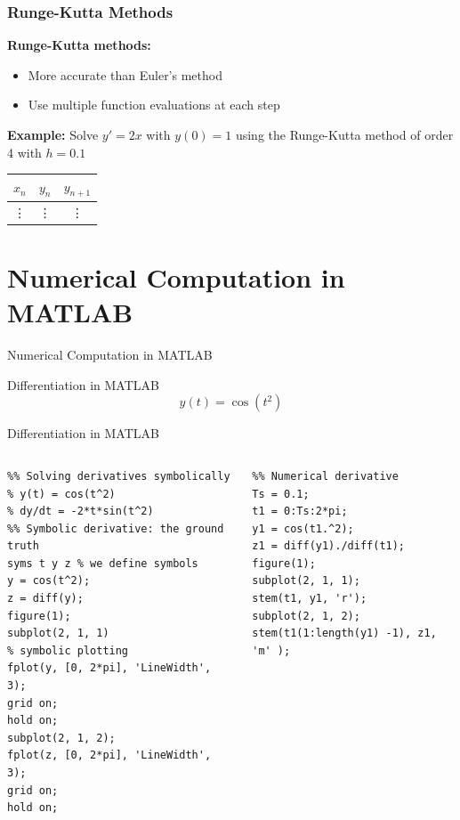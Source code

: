 \documentclass[aspectratio=169,xcolor=dvipsnames,svgnames,x11names,fleqn]{beamer}
\begin{document}
\begin{frame}
  \frametitle{Runge-Kutta Methods}
  \textbf{Runge-Kutta methods:}
  \begin{itemize}
    \item More accurate than Euler's method
    \item Use multiple function evaluations at each step
  \end{itemize}
  \textbf{Example:} Solve $y' = 2x$ with $y(0) = 1$ using the Runge-Kutta method of order 4 with $h = 0.1$
  \begin{table}
    \begin{tabular}{c|c|c}
      $x_n$ & $y_n$ & $y_{n+1}$ \\
      \hline
      \vdots & \vdots & \vdots
    \end{tabular}
  \end{table}
\end{frame}

\section{Numerical Computation in MATLAB}

\begin{frame}{}
    \begin{center}
    \Huge \bf \color{DarkBlue}
    \faFire
    
Numerical Computation in MATLAB

\end{center}
\end{frame}


\begin{frame}[containsverbatim]{Differentiation in MATLAB}
    $$
    y(t) = \cos(t^2)
    $$
\end{frame}
\begin{frame}[containsverbatim]{Differentiation in MATLAB}
    \footnotesize
\begin{columns}
    \begin{verbatim}
%% Solving derivatives symbolically
% y(t) = cos(t^2)
% dy/dt = -2*t*sin(t^2)
%% Symbolic derivative: the ground truth
syms t y z % we define symbols
y = cos(t^2);
z = diff(y);
figure(1);
subplot(2, 1, 1)
% symbolic plotting
fplot(y, [0, 2*pi], 'LineWidth', 3);
grid on;
hold on;
subplot(2, 1, 2);
fplot(z, [0, 2*pi], 'LineWidth', 3);
grid on;
hold on;
    \end{verbatim}
    \begin{verbatim}
%% Numerical derivative
Ts = 0.1;
t1 = 0:Ts:2*pi;
y1 = cos(t1.^2);
z1 = diff(y1)./diff(t1);
figure(1);
subplot(2, 1, 1);
stem(t1, y1, 'r');
subplot(2, 1, 2);
stem(t1(1:length(y1) -1), z1, 'm' );

    \end{verbatim}
\end{columns}
\end{frame}
\end{document}
